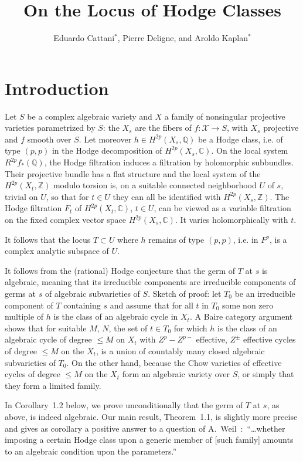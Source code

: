 \documentclass[11pt,a4paper]{article}
\title{On the Locus of Hodge Classes}
\author{Eduardo Cattani$^*$, Pierre Deligne, and Aroldo Kaplan$^*$}
\date{}
\theoremstyle{plain}
\theoremstyle{definition}
\begin{document}
\maketitle
{}

\section{Introduction}

Let $S$ be a complex algebraic variety and $X$ a family of nonsingular projective varieties parametrized by $S$: the $X_s$ are the fibers of $f:\mathcal{X}\to S$, with $X_s$ projective and $f$ smooth over $S$. Let moreover $h\in H^{2p}(X_s,\mathbb{Q})$ be a Hodge class, i.e. of type $(p,p)$ in the Hodge decomposition of $H^{2p}(X_s,\mathbb{C})$. On the local system $R^{2p}f_*(\mathbb{Q})$, the Hodge filtration induces a filtration by holomorphic subbundles. Their projective bundle has a flat structure and the local system of the $H^{2p}(X_t,\mathbb{Z})$ modulo torsion is, on a suitable connected neighborhood $U$ of $s$, trivial on $U$, so that for $t\in U$ they can all be identified with $H^{2p}(X_s,\mathbb{Z})$. The Hodge filtration $F_t$ of $H^{2p}(X_t,\mathbb{C})$, $t\in U$, can be viewed as a variable filtration on the fixed complex vector space $H^{2p}(X_s,\mathbb{C})$. It varies holomorphically with $t$.

It follows that the locus $T\subset U$ where $h$ remains of type $(p,p)$, i.e. in $F^p$, is a complex analytic subspace of $U$.

It follows from the (rational) Hodge conjecture that the germ of $T$ at $s$ is algebraic, meaning that its irreducible components are irreducible components of germs at $s$ of algebraic subvarieties of $S$. Sketch of proof: let $T_0$ be an irreducible component of $T$ containing $s$ and assume that for all $t$ in $T_0$ some non zero multiple of $h$ is the class of an algebraic cycle in $X_t$. A Baire category argument shows that for suitable $M$, $N$, the set of $t\in T_0$ for which $h$ is the class of an algebraic cycle of degree $\leq M$ on $X_t$ with $Z^p - Z^{p-}$ effective, $Z^{\pm}$ effective cycles of degree $\leq M$ on the $X_t$, is a union of countably many closed algebraic subvarieties of $T_0$. On the other hand, because the Chow varieties of effective cycles of degree $\leq M$ on the $X_t$ form an algebraic variety over $S$, or simply that they form a limited family.

In Corollary~1.2 below, we prove unconditionally that the germ of $T$ at $s$, as above, is indeed algebraic. Our main result, Theorem~1.1, is slightly more precise and gives as corollary a positive answer to a question of A.~Weil~\cite{weil}:\ ``\dots whether imposing a certain Hodge class upon a generic member of [such family] amounts to an algebraic condition upon the parameters.''
\end{document}
